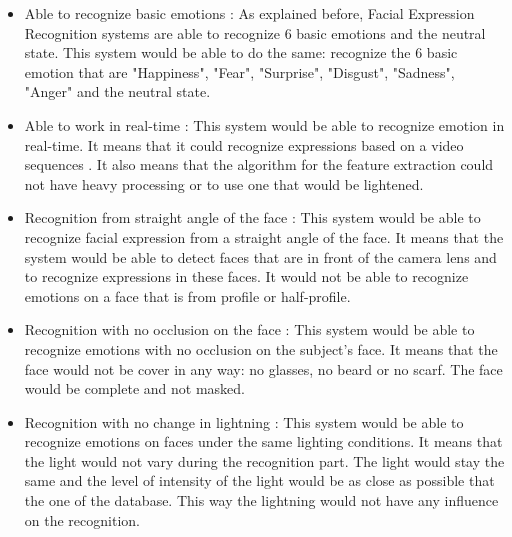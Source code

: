 \begin{itemize}
  \item Able to recognize basic emotions : 
  \noindent As explained before, Facial Expression Recognition systems are able to recognize 6 basic emotions and the neutral state. This system would be able to do the same: recognize the 6 basic emotion that are "Happiness", "Fear", "Surprise", "Disgust", "Sadness", "Anger" and the neutral state.
\newline

  \item Able to work in real-time : 
  \noindent This system would be able to recognize emotion in real-time. It means that it could recognize expressions based on a video sequences . It also means that the algorithm for the feature extraction could not have heavy processing or to use one that would be lightened. 
\newline

  \item Recognition from straight angle of the face : 
  \noindent This system would be able to recognize facial expression from a straight angle of the face. It means that the system would be able to detect faces that are in front of the camera lens and to recognize expressions in these faces. It would not be able to recognize emotions on a face that is from profile or half-profile.
\newline

  \item Recognition with no occlusion on the face : 
  \noindent This system would be able to recognize emotions with no occlusion on the subject's face. It means that the face would not be cover in any way: no glasses, no beard or no scarf. The face would be complete and not masked.
\newline

  \item Recognition with no change in lightning : 
  \noindent This system would be able to recognize emotions on faces under the same lighting conditions. It means that the light would not vary during the recognition part. The light would stay the same and the level of intensity of the light would be as close as possible that the one of the database. This way the lightning would not have any influence on the recognition.
\newline
\end{itemize}











